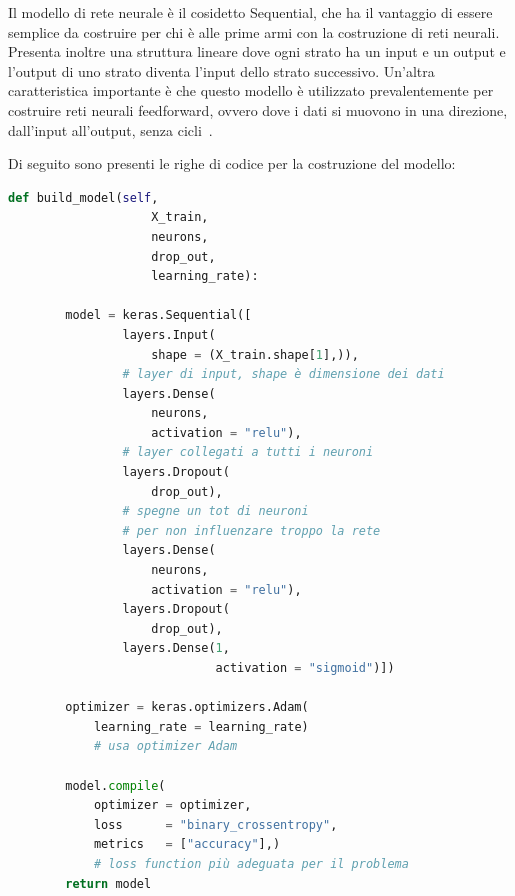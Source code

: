     Il modello di rete neurale è il cosidetto Sequential, che ha il vantaggio di essere semplice da costruire per chi è alle prime armi con la costruzione di reti neurali. Presenta inoltre una struttura lineare dove ogni strato ha un input e un output e l’output di uno strato diventa l’input dello strato successivo. Un’altra caratteristica importante è che questo modello è utilizzato prevalentemente per costruire reti neurali feedforward, ovvero dove i dati si muovono in una direzione, dall’input all’output, senza cicli~\cite{Manaswi_2018}.

    Di seguito sono presenti le righe di codice per la costruzione del modello:

    \begin{lstlisting}[language=Python]
    def build_model(self,
                    X_train,
                    neurons,
                    drop_out,
                    learning_rate):    
        
        model = keras.Sequential([
                layers.Input(
                    shape = (X_train.shape[1],)),
                # layer di input, shape è dimensione dei dati
                layers.Dense(
                    neurons,
                    activation = "relu"),
                # layer collegati a tutti i neuroni
                layers.Dropout(
                    drop_out),
                # spegne un tot di neuroni
                # per non influenzare troppo la rete
                layers.Dense(
                    neurons,
                    activation = "relu"),
                layers.Dropout(
                    drop_out),
                layers.Dense(1,
                             activation = "sigmoid")])

        optimizer = keras.optimizers.Adam(
            learning_rate = learning_rate)
            # usa optimizer Adam

        model.compile(
            optimizer = optimizer,
            loss      = "binary_crossentropy",
            metrics   = ["accuracy"],)
            # loss function più adeguata per il problema
        return model
    \end{lstlisting}

